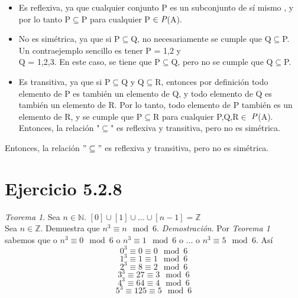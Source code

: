 \documentclass{report}
\begin{document}
\begin{itemize}
\item Es reflexiva, ya que cualquier conjunto P es un subconjunto de sí mismo , y por lo tanto P$\subseteq$P para cualquier P $\in \emph{P}$(A).
    \item No es simétrica, ya que si P$\subseteq$Q, no necesariamente se cumple que Q$\subseteq$P. Un contraejemplo sencillo es tener P = {1,2} y \\ Q = {1,2,3}. En este caso, se tiene que P$\subseteq$Q, pero no se cumple que Q$\subseteq$P.
    \item Es transitiva, ya que si P$\subseteq$Q y Q$\subseteq$R, entonces por definición todo elemento de P es también un elemento de Q, y todo elemento de Q es también un elemento de R. Por lo tanto, todo elemento de P también es un elemento de R, y se cumple que P$\subseteq$R para cualquier P,Q,R$\in$ $\emph{P}$(A).
   Entonces, la relación "$\subseteq$" es reflexiva y transitiva, pero no es simétrica.


\end{itemize}



Entonces, la relación $"\subseteq"$ es reflexiva y transitiva, pero no es simétrica.
    \section{Ejercicio 5.2.8}
        \textit{Teorema 1}. Sea $n \in \mathbb{N}$.
        $[0] \cup [1] \cup \ldots \cup [n-1] = \mathbb{Z}$\\

        \noindent Sea $n \in \mathbb{Z}$. Demuestra que $n^3 \equiv n\mod 6$. \textit{Demostración}. Por \textit{Teorema 1} sabemos que o $n^3 \equiv 0 \mod 6$ o $n^3 \equiv 1 \mod 6$ o ... o $n^3 \equiv 5 \mod 6$. Así
        \[
            0^3 \equiv 0 \equiv 0 \mod 6
        \]
        \[
            1^3 \equiv 1 \equiv 1 \mod 6
        \]
        \[
            2^3 \equiv 8 \equiv 2 \mod 6
        \]
        \[
            3^3 \equiv 27 \equiv 3 \mod 6
        \]
        \[
            4^3 \equiv 64 \equiv 4 \mod 6
        \]
        \[
            5^3 \equiv 125 \equiv 5 \mod 6
        \]
\end{document}
